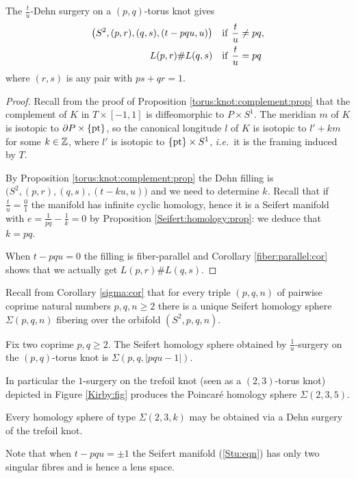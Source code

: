\begin{prop}
The $\frac tu$-Dehn surgery on a $(p,q)$-torus knot gives
\begin{align} 
\big(S^2, (p,r), (q,s), (t-pqu,u)\big) & \quad {\rm if}\ \frac {t}u \neq pq, \label{Stu:eqn} \\
L(p,r) \# L(q,s) & \quad {\rm if}\ \frac tu = pq
\end{align}
where $(r,s)$ is any pair with $ps+qr = 1$.
\end{prop}
\begin{proof}
Recall from the proof of Proposition \ref{torus:knot:complement:prop} that the complement of $K$ in $T\times [-1,1]$ is diffeomorphic to $P\times S^1$. The meridian $m$ of $K$ is isotopic to $\partial P \times \{{\rm pt}\}$, so the canonical longitude $l$ of $K$ is isotopic to $l'+km$ for some $k\in \mathbb{Z}$, where $l'$ is isotopic to $\{{\rm pt}\}\times S^1$, \emph{i.e.}~it is the framing induced by $T$.

By Proposition \ref{torus:knot:complement:prop} the Dehn filling is $\big(S^2, (p,r), (q,s), (t-ku,u)\big)$ and we need to determine $k$. Recall that if $\frac tu = \frac 01$ the manifold has infinite cyclic homology, hence it is a Seifert manifold with $e=\frac 1{pq}-\frac 1k = 0$ by Proposition \ref{Seifert:homology:prop}: we deduce that $k=pq$.

When $t-pqu = 0$ the filling is fiber-parallel and Corollary \ref{fiber:parallel:cor} shows that we actually get $L(p,r) \# L(q,s)$.
\end{proof}
Recall from Corollary \ref{sigma:cor} that for every triple $(p,q,n)$ of pairwise coprime natural numbers $p,q,n\geqslant 2$ there is a unique Seifert homology sphere $\Sigma(p,q,n)$ fibering over the orbifold $(S^2,p,q,n)$.

\begin{cor}
Fix two coprime $p,q \geqslant 2$. The Seifert homology sphere obtained by $\frac 1u$-surgery on the $(p,q)$-torus knot is $\Sigma(p,q,|pqu-1|)$.
\end{cor}
In particular the $1$-surgery on the trefoil knot (seen as a $(2,3)$-torus knot) depicted in Figure \ref{Kirby:fig} produces the Poincar\'e homology sphere $\Sigma(2,3,5)$.
 
\begin{ex} Every homology sphere of type $\Sigma(2,3,k)$ may be obtained via a Dehn surgery of the trefoil knot.
\end{ex}

Note that when $t-pqu = \pm 1$ the Seifert manifold (\ref{Stu:eqn}) has only two singular fibres and is hence a lens space.


